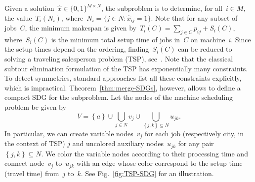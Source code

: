 \documentclass[a4paper,10pt]{article}
\newcommand{\B}[1]{\{0,1\}^{#1}}
\newcommand{\fixed}[1]{\hat{ #1 }}
\newcommand{\brackets}[1]{\left\{ #1 \right\}}
\theoremstyle{definition}
\begin{document}
Given a solution~$\fixed{x} \in \B{M \times N}$, the subproblem is to determine, for all~${i \in M}$, the value~$T_i(N_i)$, where~$N_i = \{j \in N : \fixed{x}_{ij} = 1\}$.
Note that for any subset of jobs~$C$, the minimum makespan is given by~$T_i(C) = \sum_{j\in C} p_{ij} + S_i(C)$, where~$S_i(C)$ is the minimum total setup time of jobs in~$C$ on machine~$i$.
Since the setup times depend on the ordering, finding~$S_i(C)$ can be reduced to solving a traveling salesperson problem (TSP), see~\cite{tran2016decomposition}.
Note that the classical subtour elimination formulation of the TSP has exponentially many constraints.
To detect symmetries, standard approaches list all these constraints explicitly, which is impractical.
Theorem~\ref{thm:merge-SDGs}, however, allows to define a compact SDG for the subproblem.
Let the nodes of the machine scheduling problem be given by
\begin{equation*}
  V = \brackets{a} \cup \bigcup_{j\in N} v_j \cup \bigcup_{\brackets{j, k} \subseteq N} u_{jk}.
\end{equation*}
In particular, we can create variable nodes~$v_j$ for each job (respectively city, in the context of TSP) $j$ and uncolored auxiliary nodes~$u_{jk}$ for any pair~$\brackets{j, k}\subseteq N$.
We color the variable nodes according to their processing time and connect node~$v_j$ to~$u_{jk}$ with an edge whose color correspond to the setup time (travel time) from~$j$ to~$k$.
See Fig.~\ref{fig:TSP-SDG} for an illustration.
\end{document}
